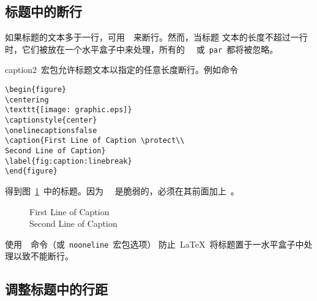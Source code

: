 \subsection{标题中的断行}

如果标题的文本多于一行，可用~~来断行。然而，当标题
文本的长度不超过一行时，它们被放在一个水平盒子中来处理，所有的
~\texttt{\bs\bs}~或~\texttt{\bs par}~都将被忽略。

\textsf{caption2}~宏包允许标题文本以指定的任意长度断行。例如命令
\begin{Verbatim}[xleftmargin=1cm]
\begin{figure} 
\centering 
\texttt{[image: graphic.eps]} 
\captionstyle{center} 
\onelinecaptionsfalse 
\caption{First Line of Caption \protect\\ 
Second Line of Caption} 
\label{fig:caption:linebreak} 
\end{figure}
\end{Verbatim}
得到图~\ref{fig:caption:linebreak}~中的标题。因为~\texttt{\bs\bs}~
是脆弱的，必须在其前面加上~。

\begin{figure}
	\centering
	\resizebox{2in}{!}{\usebox{\graphic}}
	\onelinecaptionsfalse
	\caption{First Line of Caption \protect\\ 
		Second Line of Caption}
	\label{fig:caption:linebreak}
\end{figure}

使用~~命令（或~\texttt{nooneline}~宏包选项）
防止~\LaTeX{}~将标题置于一水平盒子中处理以致不能断行。

\clearpage

\subsection{调整标题中的行距}

